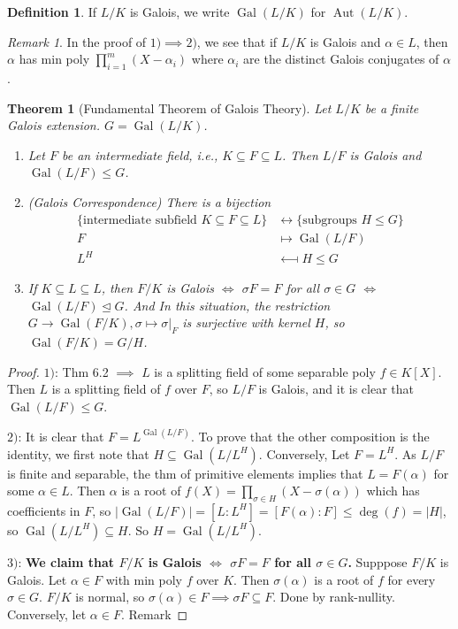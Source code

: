 \documentclass{article}
\theoremstyle{definition}
\newtheorem*{defn*}{Definition}
\theoremstyle{remark}
\newtheorem{rem}{Remark}
\theoremstyle{plain}
\newtheorem{thm}[defn]{Theorem}
\newcommand{\Aut}{\operatorname{Aut}}
\newcommand{\Gal}{\operatorname{Gal}}
\begin{document}
\begin{defn*}
    If $L/K$ is Galois, we write $\Gal(L/K)$ for $\Aut(L/K)$.
\end{defn*}
\begin{rem}
    In the proof of $1)\implies 2)$, we see that if $L/K$ is Galois and $\alpha\in L$, then $\alpha$ has min poly $\prod_{i=1}^m(X-\alpha_i)$ where $\alpha_i$ are the distinct Galois conjugates of $\alpha$.
\end{rem}
\begin{thm}[Fundamental Theorem of Galois Theory]
    Let $L/K$ be a finite Galois extension. $G=\Gal(L/K)$.
    \begin{enumerate}
        \item Let $F$ be an intermediate field, i.e., $K\subseteq F\subseteq L$. Then $L/F$ is Galois and $\Gal(L/F)\le G$.
        \item (Galois Correspondence) There is a bijection 
        \begin{align*}
            \{\text{intermediate subfield }K\subseteq F\subseteq L\}&\longleftrightarrow\{\text{subgroups } H\le G\}\\
            F&\longmapsto\Gal(L/F)\\
            L^H&\longmapsfrom H\le G
        \end{align*}
        \item If $K\subseteq L\subseteq L$, then $F/K$ is Galois $\Leftrightarrow$ $\sigma F=F$ for all $\sigma\in G$ $\Leftrightarrow$ $\Gal(L/F)\trianglelefteq G$. And In this situation, the restriction $G\to \Gal(F/K), \sigma\mapsto \sigma|_F$ is surjective with kernel $H$, so $\Gal(F/K)=G/H$.
    \end{enumerate}
\end{thm}
\begin{proof}
    $1)$: Thm 6.2 $\implies$ $L$ is a splitting field of some separable poly $f\in K[X]$. Then $L$ is a splitting field of $f$ over $F$, so $L/F$ is Galois, and it is clear that $\Gal(L/F)\le G$. 

    $2)$: It is clear that $F=L^{\Gal(L/F)}$. To prove that the other composition is the identity, we first note that $H\subseteq\Gal(L/L^H)$. Conversely, Let $F=L^H$. As $L/F$ is finite and separable, the thm of primitive elements implies that $L=F(\alpha)$ for some $\alpha\in L$. Then $\alpha$ is a root of $f(X)=\prod_{\sigma\in H}(X-\sigma(\alpha))$ which has coefficients in $F$, so $|\Gal(L/F)|=[L:L^H]=[F(\alpha):F]\le\deg(f)=|H|$, so $\Gal(L/L^H)\subseteq H$. So $H=\Gal(L/L^H)$.

    $3)$: \textbf{We claim that $F/K$ is Galois $\Leftrightarrow$ $\sigma F=F$ for all $\sigma\in G$.} Supppose $F/K$ is Galois. Let $\alpha\in F$ with min poly $f$ over $K$. Then $\sigma(\alpha)$ is a root of $f$ for every $\sigma\in G$. $F/K$ is normal, so $\sigma(\alpha)\in F\implies \sigma F\subseteq F$. Done by rank-nullity. Conversely, let $\alpha\in F$. Remark
\end{proof}
\end{document}
